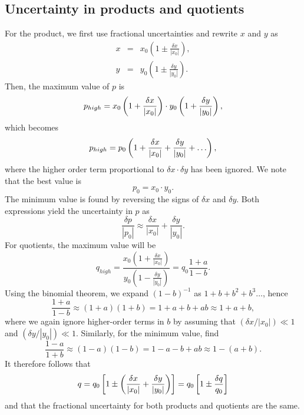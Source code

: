 \subsection{Uncertainty in products and quotients}
For the product, we first use fractional uncertainties and rewrite $x$ and $y$ as
\begin{eqnarray*}
x & = & x_0 \left ( 1 \pm \frac{\delta x} {\left | x_0\right |} \right ),\\[10pt]
y & = & y_0 \left ( 1 \pm \frac{\delta y} {\left | y_0\right |} \right ).
\end{eqnarray*}
Then, the maximum value of $p$ is
\begin{equation}
\index{Uncertainty!products}
p_{high} = x_0 \left( 1 + \frac{\delta x} {\left | x_0 \right |} \right)
\cdot y_0  \left( 1 + \frac{\delta y} {\left | y_0\right |} \right),
\end{equation}
which becomes
\begin{equation}
\index{Uncertainty!products}
p_{high} = p_0  \left( 1 + \frac{\delta x} {\left | x_0\right |} +
\frac{\delta y} {\left | y_0\right |} + \ldots \right),
\end{equation}
where the higher order term proportional to $\delta x \cdot \delta y$ has been ignored.  We note that the best value is
\begin{equation}
p_0 = x_0 \cdot y_0.
\end{equation}
The minimum value is found by reversing the signs of $\delta x$ and $\delta y$.  Both expressions yield the uncertainty in 
$p$ as
\begin{equation}
\frac{\delta p} {\left | p_0\right |} \approx \frac{\delta x} {\left | x_0\right |} +
\frac{\delta y} {\left | y_0 \right |}.
\end{equation}	 
 For quotients, the maximum value will be
\begin{equation}
q_{high} = \frac{   x_0 \left ( 1 + \frac{\delta x} {\left | x_0\right |}\right) }
 { y_0 \left( 1 -  \frac{\delta y} {\left | y_0 \right |} \right)} =
q_0 \frac{1 + a}{1 -b}. 
\end{equation}
Using the binomial theorem, we expand $(1-b)^{-1}$ as 
$1+b+b^2+b^3\ldots$, hence
\begin{equation}
\frac{1+a}{1-b} \approx (1+a) (1+b)= 1+a + b + ab \approx 1 + a + b,
\end{equation}	 
where we again ignore higher-order terms in $b$ by assuming that $(\delta x/|x_0|) \ll 1$ and $(\delta y/|y_0|) \ll 1$.
Similarly, for the minimum value, find
\begin{equation}
\frac{1 - a}{1+b} \approx (1- a) (1- b)= 1 - a - b + ab \approx 1 - ( a + b).
\end{equation}	 
It therefore follows that
\begin{equation}
	\index{Uncertainty!quotients}
	q = q_0 \left[ 1 \pm \left( \frac{\delta x} {\left | x_0 \right |} +
	\frac{\delta y }{\left | y_0 \right |} \right) \right] =
	q_0 \left[ 1 \pm \frac{\delta q}{q_0} \right]
\end{equation}
and that the fractional uncertainty for both products and quotients are the same.

